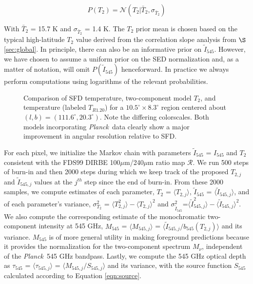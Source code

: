 \documentclass{emulateapj}
\newcommand{\PLANCK}{{\it Planck}}
\begin{document}
\begin{equation} \label{equ:t2prior}
P(T_2) = \mathcal{N}(T_2|\bar{T}_2, \sigma_{\bar{T}_2})
\end{equation}

With $\bar{T}_2$ = 15.7 K and $\sigma_{\bar{T}_2}$ = 1.4 K. The $T_2$ prior 
mean is chosen based on the typical high-latitude $T_2$ value derived from
the correlation slope analysis from $\S$\ref{sec:global}. In principle, there 
can also be an informative prior on $\tilde{I}_{545}$. However, we have chosen 
to assume a uniform prior on the SED normalization and, as a matter of 
notation, will omit $P(\tilde{I}_{545})$ henceforward. In practice we always 
perform computations using logarithms of the relevant probabilities.

\begin{figure}
\begin{center}
\caption{\label{fig:comparison} Comparison of SFD temperature, two-component 
model $T_2$, and \cite{planckdust} temperature (labeled $T_{R1.20}$) for a
 $10.5^{\circ}\times8.3^{\circ}$  region centered about 
$(l,b) = (111.6^{\circ}, 20.3^{\circ})$. Note the differing colorscales. Both 
models incorporating \PLANCK~data clearly show a major improvement in angular 
resolution relative to SFD.}
\end{center}
\end{figure}

For each pixel, we initialize the Markov chain with parameters 
$\tilde{I}_{545}$ = $I_{545}$ and $T_2$ consistent with the FDS99 
DIRBE 100$\mu$m/240$\mu$m ratio map $\mathscr{R}$. We run 500 steps of burn-in 
and then 2000 steps during which we keep track of the proposed $T_{2, j}$ and 
$\tilde{I}_{545, j}$ values at the $j^{th}$ step since the end of burn-in. From
 these 2000 samples, we compute estimates of each parameter, 
$T_2$ = $\langle T_{2, j} \rangle$, $\tilde{I}_{545}$ = 
$\langle \tilde{I}_{545, j} \rangle$, and of each parameter's variance, 
$\sigma^2_{T_2}$ = $\langle T^2_{2, j} \rangle-\langle T_{2, j} \rangle ^2$ and
 $\sigma^2_{\tilde{I}_{545}}$=$\langle \tilde{I}^2_{545, j} 
\rangle-\langle \tilde{I}_{545, j} \rangle ^2$. We also compute the
 corresponding estimate of the monochromatic two-component intensity at 545 
GHz, $M_{545}$ = $\langle M_{545, j} \rangle$ = 
$\langle \tilde{I}_{545, j}/b_{545}(T_{2,j}) \rangle$  and its variance. 
$M_{545}$ is of more general utility in making foreground predictions because 
it provides the normalization for the two-component spectrum $M_{\nu}$, 
independent of the \PLANCK~545 GHz bandpass. Lastly, we compute the 545 GHz
optical depth as $\tau_{545}$ = $\langle \tau_{545, j} \rangle$ = 
$\langle M_{545, j}/S_{545, j} \rangle$ and its variance, with the source 
function $S_{545}$ calculated according to Equation \ref{eqn:source}.
\end{document}

